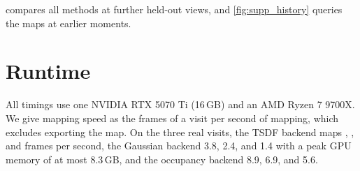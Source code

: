 

 compares all methods at further held-out views, and \cref{fig:supp_history} queries the maps
at earlier moments.

\section{Runtime}
\label{sec:supp_runtime}

All timings use one NVIDIA RTX 5070 Ti (16\,GB) and an AMD Ryzen 7 9700X. We give mapping speed as the frames of a visit
per second of mapping, which excludes exporting the map. On the three real
visits, the TSDF backend maps , , and  frames per second, the Gaussian backend 3.8, 2.4, and 1.4 with a peak GPU
memory of at most 8.3\,GB, and the occupancy backend 8.9, 6.9, and 5.6.
